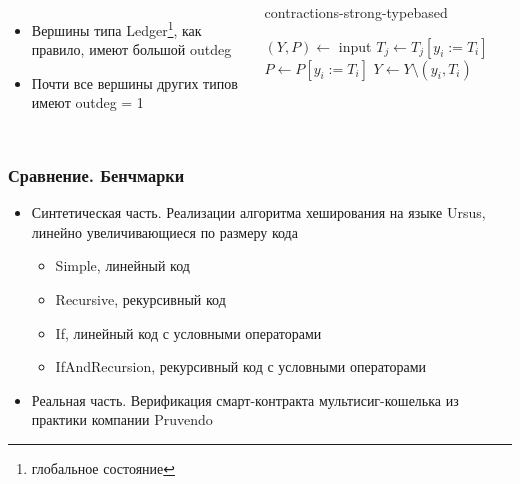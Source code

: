 \documentclass{beamer}
\begin{document}
\begin{frame}
\begin{columns}
  \begin{itemize}
    \item Вершины типа Ledger\footnote{глобальное состояние}, как правило, имеют большой outdeg
    \item Почти все вершины других типов имеют outdeg = 1
  \end{itemize}
  \begin{megaalgorithm}\tiny 
    \caption{\tiny contractions-strong-typebased}
  \begin{algorithmic}
    \State $(Y, P)\gets$ input
        \If{\textcolor{red}{$typeof(y_i)$ is not $Ledger$}}
                \State $T_j \gets T_j [y_i := T_i]$
            \EndFor
            \State $P \gets P [y_i := T_i]$
            \State $Y\gets Y \setminus (y_i, T_i)$
        \EndIf
    \EndFor
    \State {}
  \end{algorithmic}
\end{megaalgorithm}  
  \end{columns}
\end{frame}

\begin{frame}\frametitle{Сравнение. Бенчмарки}
  \begin{itemize}
    \item Синтетическая часть. Реализации алгоритма хеширования на языке Ursus, линейно увеличивающиеся по размеру кода
    \begin{itemize}
      \item Simple, линейный код
      \item Recursive, рекурсивный код
      \item If, линейный код с условными операторами
      \item IfAndRecursion, рекурсивный код с условными операторами
    \end{itemize}
    \item Реальная часть. Верификация смарт-контракта мультисиг-кошелька из практики компании Pruvendo
  \end{itemize}
  \end{frame}
\end{document}
